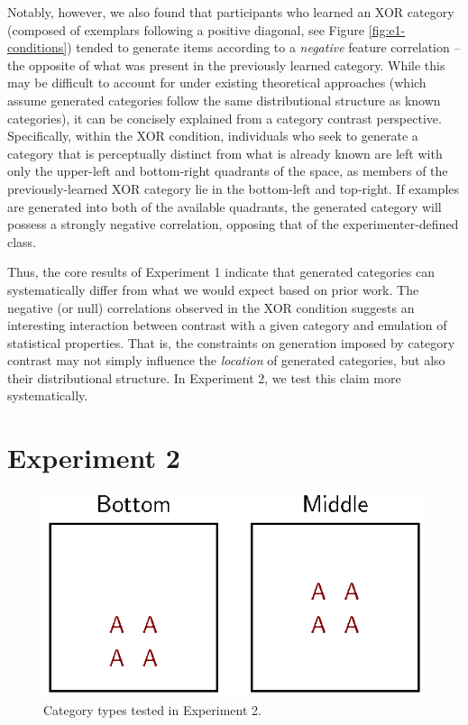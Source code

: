 \documentclass[pdflatex,sn-apa]{sn-jnl}%
\theoremstyle{thmstyleone}%
\theoremstyle{thmstyletwo}%
\theoremstyle{thmstylethree}%
\begin{document}
Notably, however, we also found that participants who learned an XOR category
(composed of exemplars following a positive diagonal, see Figure
\ref{fig:e1-conditions}) tended to generate items according to a {\em negative}
feature correlation -- the opposite of what was present in the previously
learned category. While this may be difficult to account for under existing
theoretical approaches (which assume generated categories follow the same
distributional structure as known categories), it can be concisely explained
from a category contrast perspective. Specifically, within the XOR condition,
individuals who seek to generate a category that is perceptually distinct from
what is already known are left with only the upper-left and bottom-right
quadrants of the space, as members of the previously-learned XOR category lie in
the bottom-left and top-right. If examples are generated into both of the
available quadrants, the generated category will possess a strongly negative
correlation, opposing that of the experimenter-defined class.

Thus, the core results of Experiment 1 indicate that generated categories can
systematically differ from what we would expect based on prior work. The
negative (or null) correlations observed in the XOR condition suggests an
interesting interaction between contrast with a given category and emulation of
statistical properties. That is, the constraints on generation imposed by
category contrast may not simply influence the {\em location} of generated
categories, but also their distributional structure. In Experiment 2, we test
this claim more systematically.


\section{Experiment 2}

\begin{figure}
    \begin{center} \includegraphics{figs/e2-conditions.eps}
    \caption{Category types tested in Experiment 2.}
    \label{fig:e2-conditions}
    \end{center}
\end{figure}
\end{document}
